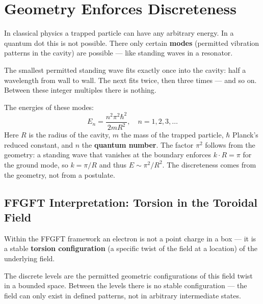 \section{Geometry Enforces Discreteness}
\label{sec:geometry}

In classical physics a trapped particle can have any arbitrary energy.
In a quantum dot this is not possible. There only certain \textbf{modes}
(permitted vibration patterns in the cavity) are possible ---
like standing waves in a resonator.

The smallest permitted standing wave fits exactly once
into the cavity: half a wavelength from wall to wall.
The next fits twice, then three times --- and so on.
Between these integer multiples there is nothing.

The energies of these modes:
\begin{equation}
  E_n = \frac{n^2 \pi^2 \hbar^2}{2m R^2},
  \quad n = 1, 2, 3, \ldots
\end{equation}
Here $R$ is the radius of the cavity, $m$ the mass of the
trapped particle, $\hbar$ Planck's reduced constant,
and $n$ the \textbf{quantum number}.
The factor $\pi^2$ follows from the geometry: a standing wave
that vanishes at the boundary enforces $k \cdot R = \pi$ for the ground mode,
so $k = \pi/R$ and thus $E \sim \pi^2/R^2$.
The discreteness comes from the geometry, not from a postulate.

\subsection{FFGFT Interpretation: Torsion in the Toroidal Field}

Within the FFGFT framework an electron is not a point charge
in a box --- it is a stable
\textbf{torsion configuration} (a specific twist of the field
at a location) of the underlying field.

The discrete levels are the permitted geometric
configurations of this field twist in a bounded space.
Between the levels there is no stable configuration ---
the field can only exist in defined patterns,
not in arbitrary intermediate states.

